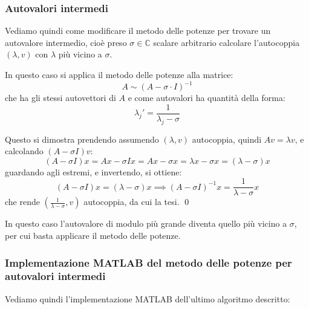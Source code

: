 \documentclass[a4paper,11pt]{article}
\begin{document}
\subsubsection{Autovalori intermedi}
Vediamo quindi come modificare il metodo delle potenze per trovare un autovalore intermedio, cioè preso $\sigma \in \mathbb{C}$ scalare arbitrario calcolare l'autocoppia $(\lambda, v)$ con $\lambda$ più vicino a $\sigma$.

In questo caso si applica il metodo delle potenze alla matrice:
$$
A \sim (A - \sigma \cdot I)^{-1}
$$
che ha gli stessi autovettori di $A$ e come autovalori ha quantità della forma:
$$
\lambda_j' = \frac{1}{\lambda_j - \sigma}
$$

Questo si dimostra prendendo assumendo $(\lambda, v)$ autocoppia, quindi $Av = \lambda v$, e calcolando $(A - \sigma I) v$:
$$
(A - \sigma I) x = A x - \sigma I x = A x - \sigma x = \lambda x - \sigma x = (\lambda - \sigma) x
$$
guardando agli estremi, e invertendo, si ottiene:
$$
(A - \sigma I) x = (\lambda - \sigma) x \implies (A - \sigma I)^{-1} x = \frac{1}{\lambda - \sigma} x
$$
che rende $\left(\frac{1}{\lambda - \sigma}, v\right)$ autocoppia, da cui la tesi. \qed

In questo caso l'autovalore di modulo più grande diventa quello più vicino a $\sigma$, per cui basta applicare il metodo delle potenze.

\subsubsection{Implementazione MATLAB del metodo delle potenze per autovalori intermedi}
Vediamo quindi l'implementazione MATLAB dell'ultimo algoritmo descritto:

\end{document}
